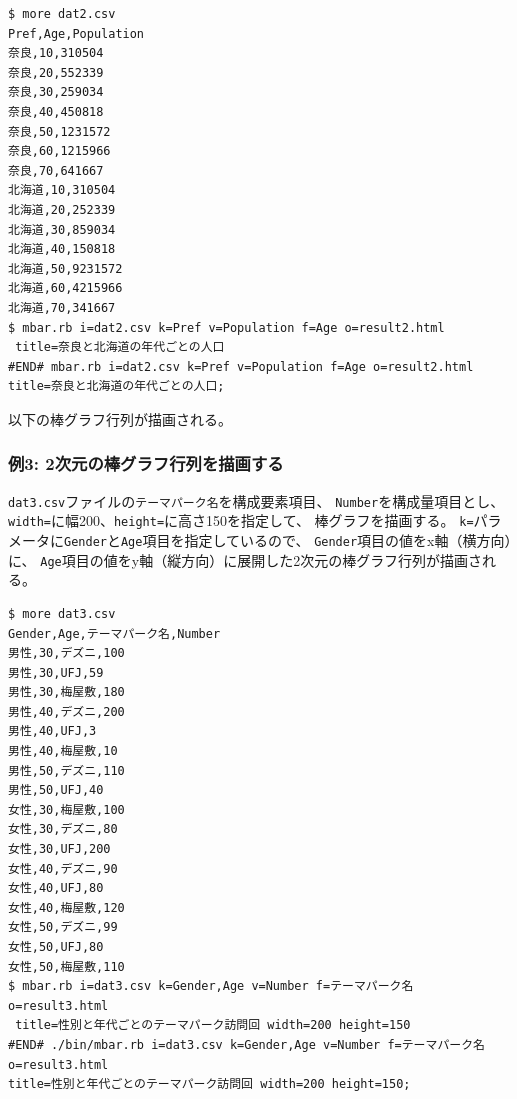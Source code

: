 \begin{Verbatim}[baselinestretch=0.7,frame=single]
$ more dat2.csv
Pref,Age,Population
奈良,10,310504
奈良,20,552339
奈良,30,259034
奈良,40,450818
奈良,50,1231572
奈良,60,1215966
奈良,70,641667
北海道,10,310504
北海道,20,252339
北海道,30,859034
北海道,40,150818
北海道,50,9231572
北海道,60,4215966
北海道,70,341667
$ mbar.rb i=dat2.csv k=Pref v=Population f=Age o=result2.html
 title=奈良と北海道の年代ごとの人口
#END# mbar.rb i=dat2.csv k=Pref v=Population f=Age o=result2.html
title=奈良と北海道の年代ごとの人口;
\end{Verbatim}

以下の棒グラフ行列が描画される。

\begin{flushleft}
\end{flushleft}

\subsubsection*{例3: 2次元の棒グラフ行列を描画する}

\verb|dat3.csv|ファイルの\verb|テーマパーク名|を構成要素項目、
\verb|Number|を構成量項目とし、\verb|width=|に幅200、\verb|height=|に高さ150を指定して、
棒グラフを描画する。
\verb|k=|パラメータに\verb|Gender|と\verb|Age|項目を指定しているので、
\verb|Gender|項目の値をx軸（横方向）に、
\verb|Age|項目の値をy軸（縦方向）に展開した2次元の棒グラフ行列が描画される。

\begin{noautoxspacing}
\begin{Verbatim}[baselinestretch=0.7,frame=single]
$ more dat3.csv
Gender,Age,テーマパーク名,Number
男性,30,デズニ,100
男性,30,UFJ,59
男性,30,梅屋敷,180
男性,40,デズニ,200
男性,40,UFJ,3
男性,40,梅屋敷,10
男性,50,デズニ,110
男性,50,UFJ,40
女性,30,梅屋敷,100
女性,30,デズニ,80
女性,30,UFJ,200
女性,40,デズニ,90
女性,40,UFJ,80
女性,40,梅屋敷,120
女性,50,デズニ,99
女性,50,UFJ,80
女性,50,梅屋敷,110
$ mbar.rb i=dat3.csv k=Gender,Age v=Number f=テーマパーク名 o=result3.html
 title=性別と年代ごとのテーマパーク訪問回 width=200 height=150
#END# ./bin/mbar.rb i=dat3.csv k=Gender,Age v=Number f=テーマパーク名 o=result3.html 
title=性別と年代ごとのテーマパーク訪問回 width=200 height=150;
\end{Verbatim}
\end{noautoxspacing}

